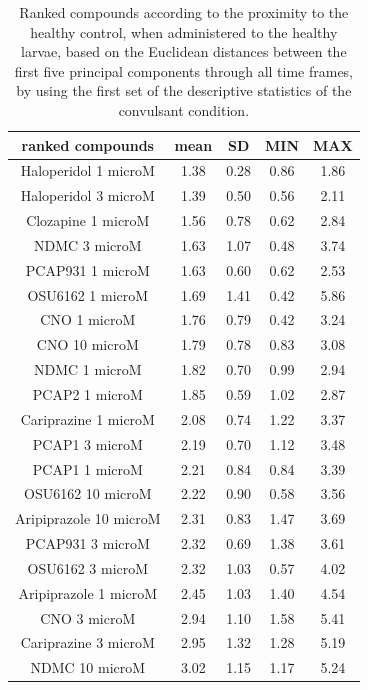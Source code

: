 \documentclass[a4paper,12pt]{article}
\begin{document}
\begin{table}[h!]\tiny
\centering
\caption{Ranked compounds according to the proximity to the healthy control, when administered to the healthy larvae, based on the Euclidean distances between the first five principal components through all time frames, by using the first set of the descriptive statistics of the convulsant condition.}
\begin{tabular}{|c|c|c|c|c|}
\hline
ranked compounds             & mean & SD   & MIN  & MAX   \\ \hline
Haloperidol 1 microM   & 1.38 & 0.28 & 0.86 & 1.86 \\ \hline
Haloperidol 3 microM   & 1.39 & 0.50  & 0.56 & 2.11 \\ \hline
Clozapine 1 microM     & 1.56 & 0.78 & 0.62 & 2.84 \\ \hline
NDMC 3 microM          & 1.63 & 1.07 & 0.48 & 3.74 \\ \hline
PCAP931 1 microM       & 1.63 & 0.60  & 0.62 & 2.53 \\ \hline
OSU6162 1 microM       & 1.69 & 1.41 & 0.42 & 5.86 \\ \hline
CNO 1 microM           & 1.76 & 0.79 & 0.42 & 3.24 \\ \hline
CNO 10 microM          & 1.79 & 0.78 & 0.83 & 3.08 \\ \hline
NDMC 1 microM          & 1.82 & 0.70  & 0.99 & 2.94 \\ \hline
PCAP2 1 microM         & 1.85 & 0.59 & 1.02 & 2.87 \\ \hline
Cariprazine 1 microM   & 2.08 & 0.74 & 1.22 & 3.37 \\ \hline
PCAP1 3 microM         & 2.19 & 0.70  & 1.12 & 3.48 \\ \hline
PCAP1 1 microM         & 2.21 & 0.84 & 0.84 & 3.39 \\ \hline
OSU6162 10 microM      & 2.22 & 0.90  & 0.58 & 3.56 \\ \hline
Aripiprazole 10 microM & 2.31 & 0.83 & 1.47 & 3.69 \\ \hline
PCAP931 3 microM       & 2.32 & 0.69 & 1.38 & 3.61 \\ \hline
OSU6162 3 microM       & 2.32 & 1.03 & 0.57 & 4.02 \\ \hline
Aripiprazole 1 microM  & 2.45 & 1.03 & 1.40  & 4.54 \\ \hline
CNO 3 microM           & 2.94 & 1.10  & 1.58 & 5.41 \\ \hline
Cariprazine 3 microM   & 2.95 & 1.32 & 1.28 & 5.19 \\ \hline
NDMC 10 microM         & 3.02 & 1.15 & 1.17 & 5.24 \\ \hline

\end{tabular}
\end{table}
\end{document}
